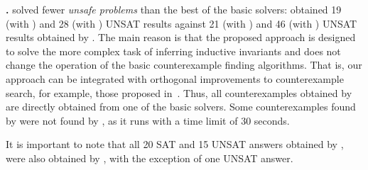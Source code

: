 \textbf{\theringenCICI{}.} \theringenCICI{} solved fewer \textit{unsafe problems} than the best of the basic solvers: \theringenCICI{} obtained 19 (with \cvc{}) and 28 (with \vampire{}) UNSAT results against 21 (with \cvc{}) and 46 (with \vampire{}) UNSAT results obtained by \theringen{}. The main reason is that the proposed approach is designed to solve the more complex task of inferring inductive invariants and does not change the operation of the basic counterexample finding algorithms. That is, our approach can be integrated with orthogonal improvements to counterexample search, for example, those proposed in~\cite{blicha2022transition}. Thus, all counterexamples obtained by \theringenCICI{} are directly obtained from one of the basic solvers. Some counterexamples found by \theringen{} were not found by \theringenCICI{}, as it runs \theringen{} with a time limit of 30 seconds.

It is important to note that all 20 SAT and 15 UNSAT answers obtained by \racer{}, were also obtained by \theringenCICI{}, with the exception of one UNSAT answer.


